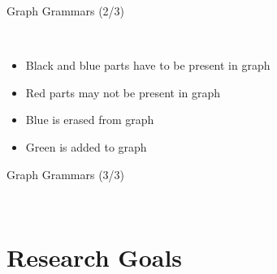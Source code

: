\documentclass{FMTslides}
\begin{document}
\begin{frame}{Graph Grammars (2/3)}
\begin{figure}
\centering
  \subfloat[?coin]{}\hspace{10px}
  \subfloat[?button]{}\\
  \subfloat[!coffee]{}
\end{figure}
\begin{itemize}
  \item Black and blue parts have to be present in graph
  \item Red parts may not be present in graph
  \item Blue is erased from graph
  \item Green is added to graph
\end{itemize}
\end{frame}

\begin{frame}{Graph Grammars (3/3)}
\begin{figure}
\centering
  \subfloat[start]{}\hspace{10px}
  \\
  \hspace{10px}
\end{figure}
\end{frame}

\section{Research Goals}
\end{document}
